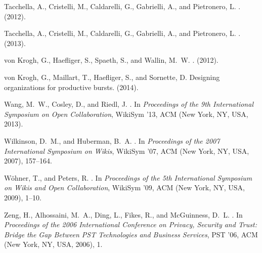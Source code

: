 \begin{thebibliography}{10}
Tacchella, A., Cristelli, M., Caldarelli, G., Gabrielli, A., and Pietronero, L.
.
 (2012).

Tacchella, A., Cristelli, M., Caldarelli, G., Gabrielli, A., and Pietronero, L.
.
 (2013).

von Krogh, G., Haefliger, S., Spaeth, S., and Wallin, M.~W.
.
 (2012).

von Krogh, G., Maillart, T., Haefliger, S., and Sornette, D.
\newblock Designing organizations for productive bursts.
 (2014).

Wang, M.~W., Cosley, D., and Riedl, J.
.
\newblock In {\em Proceedings of the 9th International Symposium on Open
  Collaboration}, WikiSym '13, ACM (New York, NY, USA, 2013).

Wilkinson, D.~M., and Huberman, B.~A.
.
\newblock In {\em Proceedings of the 2007 International Symposium on Wikis},
  WikiSym '07, ACM (New York, NY, USA, 2007), 157--164.

W\"{o}hner, T., and Peters, R.
.
\newblock In {\em Proceedings of the 5th International Symposium on Wikis and
  Open Collaboration}, WikiSym '09, ACM (New York, NY, USA, 2009), 1--10.

Zeng, H., Alhossaini, M.~A., Ding, L., Fikes, R., and McGuinness, D.~L.
.
\newblock In {\em Proceedings of the 2006 International Conference on Privacy,
  Security and Trust: Bridge the Gap Between PST Technologies and Business
  Services}, PST '06, ACM (New York, NY, USA, 2006), 1.

\end{thebibliography}
